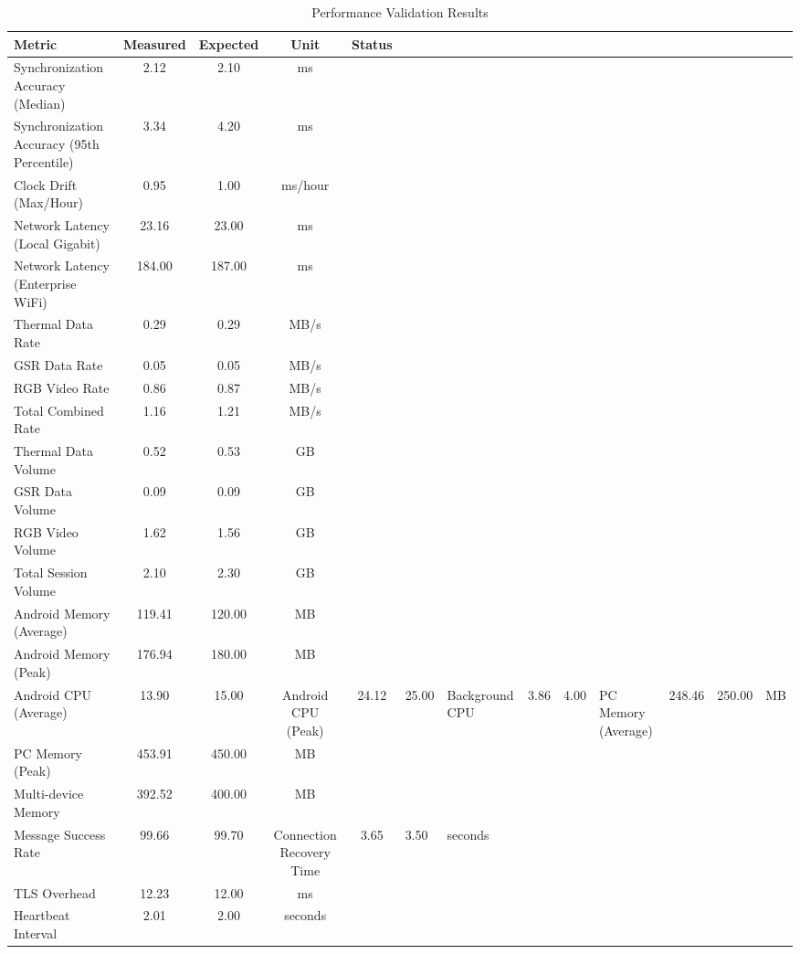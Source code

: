 
\begin{table}[htbp]
\centering
\caption{Performance Validation Results}
\begin{tabular}{|l|c|c|c|c|}
\hline
Metric & Measured & Expected & Unit & Status \\ \hline
Synchronization Accuracy (Median) & 2.12 & 2.10 & ms &  \\ \hline
Synchronization Accuracy (95th Percentile) & 3.34 & 4.20 & ms &  \\ \hline
Clock Drift (Max/Hour) & 0.95 & 1.00 & ms/hour &  \\ \hline
Network Latency (Local Gigabit) & 23.16 & 23.00 & ms &  \\ \hline
Network Latency (Enterprise WiFi) & 184.00 & 187.00 & ms &  \\ \hline
Thermal Data Rate & 0.29 & 0.29 & MB/s &  \\ \hline
GSR Data Rate & 0.05 & 0.05 & MB/s &  \\ \hline
RGB Video Rate & 0.86 & 0.87 & MB/s &  \\ \hline
Total Combined Rate & 1.16 & 1.21 & MB/s &  \\ \hline
Thermal Data Volume & 0.52 & 0.53 & GB &  \\ \hline
GSR Data Volume & 0.09 & 0.09 & GB &  \\ \hline
RGB Video Volume & 1.62 & 1.56 & GB &  \\ \hline
Total Session Volume & 2.10 & 2.30 & GB &  \\ \hline
Android Memory (Average) & 119.41 & 120.00 & MB &  \\ \hline
Android Memory (Peak) & 176.94 & 180.00 & MB &  \\ \hline
Android CPU (Average) & 13.90 & 15.00 & %
Android CPU (Peak) & 24.12 & 25.00 & %
Background CPU & 3.86 & 4.00 & %
PC Memory (Average) & 248.46 & 250.00 & MB &  \\ \hline
PC Memory (Peak) & 453.91 & 450.00 & MB &  \\ \hline
Multi-device Memory & 392.52 & 400.00 & MB &  \\ \hline
Message Success Rate & 99.66 & 99.70 & %
Connection Recovery Time & 3.65 & 3.50 & seconds &  \\ \hline
TLS Overhead & 12.23 & 12.00 & ms &  \\ \hline
Heartbeat Interval & 2.01 & 2.00 & seconds &  \\ \hline
\end{tabular}
\label{tab:performance_validation}
\end{table}

